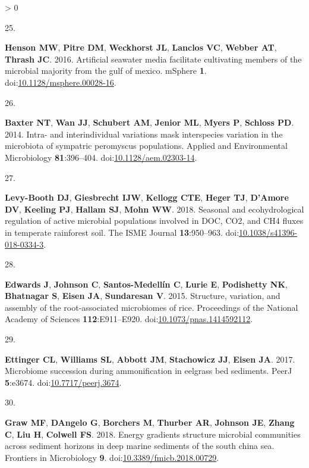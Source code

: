 \documentclass[
]{article}
\newlength{\cslhangindent}
\newlength{\csllabelwidth}
\newenvironment{CSLReferences}[3] %
 {%
  \setlength{\parindent}{0pt}
  \ifodd #1 \everypar{\setlength{\hangindent}{\cslhangindent}}\ignorespaces\fi
  \ifnum #2 > 0
  \setlength{\parskip}{#2\baselineskip}
  \fi
 }%
 {}
\newcommand{\CSLLeftMargin}[1]{\parbox[t]{\csllabelwidth}{#1}}
\newcommand{\CSLRightInline}[1]{\parbox[t]{\linewidth - \csllabelwidth}{#1}}
\begin{document}
\begin{CSLReferences}{0}{0}
\leavevmode\hypertarget{ref-Henson2016}{}%
\CSLLeftMargin{25. }
\CSLRightInline{\textbf{Henson MW}, \textbf{Pitre DM}, \textbf{Weckhorst
JL}, \textbf{Lanclos VC}, \textbf{Webber AT}, \textbf{Thrash JC}. 2016.
Artificial seawater media facilitate cultivating members of the
microbial majority from the gulf of mexico. {mSphere} \textbf{1}.
doi:\href{https://doi.org/10.1128/msphere.00028-16}{10.1128/msphere.00028-16}.}

\leavevmode\hypertarget{ref-Baxter2014}{}%
\CSLLeftMargin{26. }
\CSLRightInline{\textbf{Baxter NT}, \textbf{Wan JJ}, \textbf{Schubert
AM}, \textbf{Jenior ML}, \textbf{Myers P}, \textbf{Schloss PD}. 2014.
Intra- and interindividual variations mask interspecies variation in the
microbiota of sympatric peromyscus populations. Applied and
Environmental Microbiology \textbf{81}:396--404.
doi:\href{https://doi.org/10.1128/aem.02303-14}{10.1128/aem.02303-14}.}

\leavevmode\hypertarget{ref-LevyBooth2018}{}%
\CSLLeftMargin{27. }
\CSLRightInline{\textbf{Levy-Booth DJ}, \textbf{Giesbrecht IJW},
\textbf{Kellogg CTE}, \textbf{Heger TJ}, \textbf{D'Amore DV},
\textbf{Keeling PJ}, \textbf{Hallam SJ}, \textbf{Mohn WW}. 2018.
Seasonal and ecohydrological regulation of active microbial populations
involved in {DOC}, {CO}2, and {CH}4 fluxes in temperate rainforest soil.
The {ISME} Journal \textbf{13}:950--963.
doi:\href{https://doi.org/10.1038/s41396-018-0334-3}{10.1038/s41396-018-0334-3}.}

\leavevmode\hypertarget{ref-Edwards2015}{}%
\CSLLeftMargin{28. }
\CSLRightInline{\textbf{Edwards J}, \textbf{Johnson C},
\textbf{Santos-Medellín C}, \textbf{Lurie E}, \textbf{Podishetty NK},
\textbf{Bhatnagar S}, \textbf{Eisen JA}, \textbf{Sundaresan V}. 2015.
Structure, variation, and assembly of the root-associated microbiomes of
rice. Proceedings of the National Academy of Sciences
\textbf{112}:E911--E920.
doi:\href{https://doi.org/10.1073/pnas.1414592112}{10.1073/pnas.1414592112}.}

\leavevmode\hypertarget{ref-Ettinger2017}{}%
\CSLLeftMargin{29. }
\CSLRightInline{\textbf{Ettinger CL}, \textbf{Williams SL},
\textbf{Abbott JM}, \textbf{Stachowicz JJ}, \textbf{Eisen JA}. 2017.
Microbiome succession during ammonification in eelgrass bed sediments.
{PeerJ} \textbf{5}:e3674.
doi:\href{https://doi.org/10.7717/peerj.3674}{10.7717/peerj.3674}.}

\leavevmode\hypertarget{ref-Graw2018}{}%
\CSLLeftMargin{30. }
\CSLRightInline{\textbf{Graw MF}, \textbf{DAngelo G}, \textbf{Borchers
M}, \textbf{Thurber AR}, \textbf{Johnson JE}, \textbf{Zhang C},
\textbf{Liu H}, \textbf{Colwell FS}. 2018. Energy gradients structure
microbial communities across sediment horizons in deep marine sediments
of the south china sea. Frontiers in Microbiology \textbf{9}.
doi:\href{https://doi.org/10.3389/fmicb.2018.00729}{10.3389/fmicb.2018.00729}.}


\end{CSLReferences}
\end{document}
